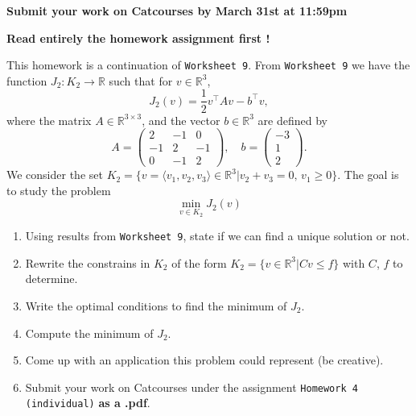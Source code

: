 \documentclass[11pt]{article}
\begin{document}
{\bf Submit your work on Catcourses by March 31st at 11:59pm}

\textbf{Read entirely the homework assignment first !}

This homework is a continuation of \texttt{Worksheet 9}. From \texttt{Worksheet 9} we have the function $J_2: K_2 \to \mathbb{R}$ such that for $v \in \mathbb{R}^3$, 
\[ J_2(v) = \frac{1}{2} v^\intercal A v - b^\intercal v,\]
where the matrix $A \in \mathbb{R}^{3 \times 3}$, and the vector $b\in \mathbb{R}^3$ are defined by
\[
A = \begin{pmatrix}
2 & -1 & 0 \\
-1 & 2 & -1 \\
0 & -1 & 2
\end{pmatrix}, \quad b = \begin{pmatrix}
-3 \\ 1 \\2
\end{pmatrix}.
\]
We consider the set $K_2 = \lbrace  v  = \langle v_1, v_2, v_3\rangle \in \mathbb{R}^3 | v_2 + v_3 = 0, \, v_1 \geq 0\rbrace$.
The goal is to study the problem
\[  \underset{ v \in K_2}{\min} J_2(v)\]

\begin{enumerate}
\item Using results from \texttt{Worksheet 9}, state if we can find a unique solution or not.
\item Rewrite the constrains in $K_2$ of the form $K_2  = \lbrace v \in \mathbb{R}^3|Cv \leq f \rbrace $ with $C$, $f$ to determine.
\item Write the optimal conditions to find the minimum of $J_2$.
\item Compute the minimum of $J_2$.
\item Come up with an application this problem could represent (be creative).
\item Submit your work on Catcourses under the assignment \texttt{Homework 4 (individual)} \textbf{as a .pdf}. 
\end{enumerate}
\end{document}
